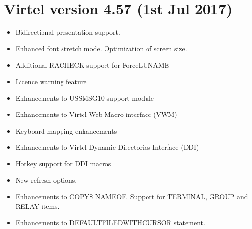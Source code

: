 \documentclass[letterpaper,10pt,english]{sphinxmanual}
\begin{document}
\section{Virtel version 4.57 (1st Jul 2017)}
\label{\detokenize{Installation_Guide:virtel-version-4-57-1st-jul-2017}}
\sphinxAtStartPar
{}
\begin{itemize}
\item {} 
\sphinxAtStartPar
Bidirectional presentation support.

\item {} 
\sphinxAtStartPar
Enhanced font stretch mode. Optimization of screen size.

\item {} 
\sphinxAtStartPar
Additional RACHECK support for ForceLUNAME

\item {} 
\sphinxAtStartPar
Licence warning feature

\item {} 
\sphinxAtStartPar
Enhancements to USSMSG10 support module

\item {} 
\sphinxAtStartPar
Enhancements to Virtel Web Macro interface (VWM)

\item {} 
\sphinxAtStartPar
Keyboard mapping enhancements

\item {} 
\sphinxAtStartPar
Enhancements to Virtel Dynamic Directories Interface (DDI)

\item {} 
\sphinxAtStartPar
Hotkey support for DDI macros

\item {} 
\sphinxAtStartPar
New refresh options.

\end{itemize}

\sphinxAtStartPar
{}
\begin{itemize}
\item {} 
\sphinxAtStartPar
Enhancements to COPY\$ NAME\sphinxhyphen{}OF. Support for TERMINAL, GROUP and RELAY items.

\item {} 
\sphinxAtStartPar
Enhancements to DEFAULT\sphinxhyphen{}FILED\sphinxhyphen{}WITH\sphinxhyphen{}CURSOR statement.

\end{itemize}
\end{document}
